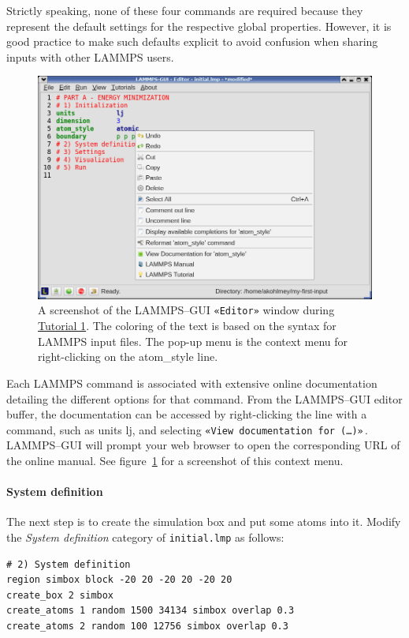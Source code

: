 \documentclass[9pt,tutorial]{livecoms}
\newcommand{\lmpcmd}[1]{\hspace{0pt}\colorbox{listing}{\textcolor{command}{\small{#1}}}\hspace{0pt}} %
\newcommand{\flecmd}[1]{\textcolor{command}{\texttt{#1}}} %
\newcommand{\guicmd}[1]{\textcolor{command}{\texttt{«#1»}}} %
\begin{document}
Strictly speaking, none of these four commands are required because
they represent the default settings for the respective global properties.
However, it is good practice to make such defaults explicit to avoid
confusion when sharing inputs with other LAMMPS users.

\begin{figure}
\centering
\includegraphics[width=\linewidth]{GUI-1.png}
\caption{A screenshot of the LAMMPS--GUI \guicmd{Editor} window during
  \hyperref[lennard-jones-label]{Tutorial 1}.  The coloring of the text
  is based on the syntax for LAMMPS input files.  The pop-up menu is the
  context menu for right-clicking on the \lmpcmd{atom\_style} line.}
\label{fig:GUI-1}
\end{figure}

Each LAMMPS command is associated with extensive online documentation
detailing the different options for that command.  From the LAMMPS--GUI
editor buffer, the documentation can be accessed by
right-clicking the line with a command, such as \lmpcmd{units lj}, and
selecting \guicmd{View documentation for (\dots)}\,.  LAMMPS--GUI will
prompt your web browser to open the corresponding URL of the online manual.  See
figure~\ref{fig:GUI-1} for a screenshot of this context menu.

\paragraph{System definition}

The next step is to create the simulation box and put some atoms into it.
Modify the \textit{System definition} category of \flecmd{initial.lmp} as follows:
\begin{lstlisting}
# 2) System definition
region simbox block -20 20 -20 20 -20 20
create_box 2 simbox
create_atoms 1 random 1500 34134 simbox overlap 0.3
create_atoms 2 random 100 12756 simbox overlap 0.3
\end{lstlisting}
\end{document}
